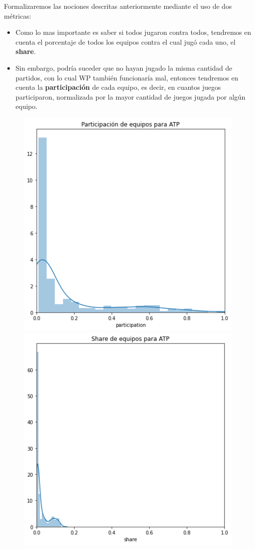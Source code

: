 \documentclass[a4paper]{article}
\begin{document}
Formalizaremos las nociones descritas anteriormente mediante el uso de dos métricas:

\begin{itemize}
    \item Como lo mas importante es saber si todos jugaron contra todos, tendremos en cuenta el porcentaje de todos los equipos contra el cual jugó cada uno, el \textbf{share}.
    \item Sin embargo, podría suceder que no hayan jugado la misma cantidad de partidos, con lo cual WP también funcionaría mal, entonces tendremos en cuenta la \textbf{participación} de cada equipo, es decir, en cuantos juegos participaron, normalizada por la mayor cantidad de juegos jugada por algún equipo.
\end{itemize}

\begin{figure}[H]
    \begin{center}
        \includegraphics[scale=0.5]{img/reales/atp-part.png}
        \includegraphics[scale=0.5]{img/reales/atp-share.png}

\end{center}
\end{figure}
\end{document}
